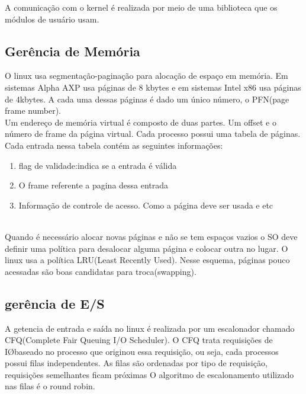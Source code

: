 \documentclass[conference]{IEEEtran}
\begin{document}
A comunicação com o kernel é realizada por meio de uma biblioteca que os módulos de usuário usam.\\

\subsection{Gerência de Memória}\label{sec:LinuxMem}

O linux usa segmentação-paginação para alocação de espaço em memória. Em sistemas Alpha AXP usa páginas de 8 kbytes e em sistemas Intel x86 usa páginas de 4kbytes. A cada uma dessas páginas é dado um único número, o PFN(page frame number)\cite{GerenciaMemLinux}.\\

Um endereço de memória virtual é composto de duas partes. Um offset e o número de frame da página virtual. Cada processo possui uma tabela de páginas. Cada entrada nessa tabela contém as seguintes informações:\\

\begin{enumerate}
	\item flag de validade:indica se a entrada é válida
	\item O frame referente a pagina dessa entrada
	\item Informação de controle de acesso. Como a página deve ser usada e etc
\end{enumerate}
\cite{GerenciaMemLinux}
\\

Quando é necessário alocar novas páginas e não se tem espaços vazios o SO deve definir uma política para desalocar alguma página e colocar outra no lugar. O linux usa a política LRU(Least Recently Used). Nesse esquema, páginas pouco acessadas são boas candidatas para troca(swapping)\cite{GerenciaIOLinux}.

\subsection{gerência de E/S}\label{sec:LinuxES}
A getencia de entrada e saída no linux é realizada por um escalonador chamado CFQ(Complete Fair Queuing I/O Scheduler). O CFQ trata requisições de I\O baseado no processo que originou essa requisição, ou seja, cada processos possui filas independentes. As filas são ordenadas por tipo de requisição, requisições semelhantes ficam próximas O algoritmo de escalonamento utilizado nas filas é o round robin\cite{GerenciaIOLinux}.
\end{document}
